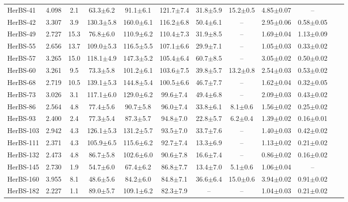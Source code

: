 \begin{landscape}
\begin{longtable}{lccccccccccr}
	HerBS-41 & 4.098 & 2.1 & 63.3$\pm$6.2 & 91.1$\pm$6.1 & 121.7$\pm$7.4 & 31.8$\pm$5.9 & 15.2$\pm$0.5 & 4.85$\pm$0.07 & --\\
	HerBS-42 & 3.307 & 3.9 & 130.3$\pm$5.8 & 160.0$\pm$6.1 & 116.2$\pm$6.8 & 50.4$\pm$6.1 & -- & 2.95$\pm$0.06 & 0.58$\pm$0.05\\
	HerBS-49 & 2.727 & 15.3 & 76.8$\pm$6.0 & 110.9$\pm$6.2 & 110.4$\pm$7.3 & 31.9$\pm$8.5 & -- & 1.69$\pm$0.04 & 1.13$\pm$0.09\\
	HerBS-55 & 2.656 & 13.7 & 109.0$\pm$5.3 & 116.5$\pm$5.5 & 107.1$\pm$6.6 & 29.9$\pm$7.1 & -- & 1.05$\pm$0.03 & 0.33$\pm$0.02\\
	HerBS-57 & 3.265 & 15.0 & 118.1$\pm$4.9 & 147.3$\pm$5.2 & 105.4$\pm$6.4 & 60.7$\pm$8.5 & -- & 3.05$\pm$0.02 & 0.50$\pm$0.02\\
	HerBS-60 & 3.261 & 9.5 & 73.3$\pm$5.8 & 101.2$\pm$6.1 & 103.6$\pm$7.5 & 39.8$\pm$5.7 & 13.2$\pm$0.8 & 2.54$\pm$0.03 & 0.53$\pm$0.02\\
	HerBS-68 & 2.719 & 10.5 & 139.1$\pm$5.3 & 144.8$\pm$5.4 & 100.5$\pm$6.6 & 46.7$\pm$7.7 & -- & 1.62$\pm$0.04 & 0.32$\pm$0.05\\
	HerBS-73 & 3.026 & 3.1 & 117.1$\pm$6.0 & 129.0$\pm$6.2 & 99.6$\pm$7.4 & 49.4$\pm$6.8 & -- & 2.09$\pm$0.03 & 0.43$\pm$0.02\\
	HerBS-86 & 2.564 & 4.8 & 77.4$\pm$5.6 & 90.7$\pm$5.8 & 96.0$\pm$7.4 & 33.8$\pm$6.1 & 8.1$\pm$0.6 & 1.56$\pm$0.02 & 0.25$\pm$0.02\\
	HerBS-93 & 2.400 & 2.4 & 77.3$\pm$5.4 & 87.3$\pm$5.7 & 94.8$\pm$7.0 & 22.8$\pm$5.7 & 6.2$\pm$0.4 & 1.39$\pm$0.02 & 0.16$\pm$0.01\\
	HerBS-103 & 2.942 & 4.3 & 126.1$\pm$5.3 & 131.2$\pm$5.7 & 93.5$\pm$7.0 & 33.7$\pm$7.6 & -- & 1.40$\pm$0.03 & 0.42$\pm$0.02\\
	HerBS-111 & 2.371 & 4.3 & 105.9$\pm$6.5 & 115.6$\pm$6.2 & 92.7$\pm$7.4 & 13.3$\pm$6.9 & -- & 1.13$\pm$0.02 & 0.21$\pm$0.02\\
	HerBS-132 & 2.473 & 4.8 & 86.7$\pm$5.8 & 102.6$\pm$6.0 & 90.6$\pm$7.8 & 16.6$\pm$7.4 & -- & 0.86$\pm$0.02 & 0.16$\pm$0.02\\
	HerBS-145 & 2.730 & 1.9 & 54.7$\pm$6.0 & 67.4$\pm$6.2 & 86.8$\pm$7.7 & 13.4$\pm$7.0 & 5.1$\pm$0.6 & 1.06$\pm$0.04 & --\\
	HerBS-160 & 3.955 & 8.1 & 48.6$\pm$5.6 & 84.2$\pm$6.0 & 84.8$\pm$7.1 & 36.6$\pm$6.4 & 15.0$\pm$0.6 & 3.94$\pm$0.02 & 0.91$\pm$0.02\\
	HerBS-182 & 2.227 & 1.1 & 89.0$\pm$5.7 & 109.1$\pm$6.2 & 82.3$\pm$7.9 & -- & -- & 1.04$\pm$0.03 & 0.21$\pm$0.02\\

\end{longtable}
\end{landscape}
